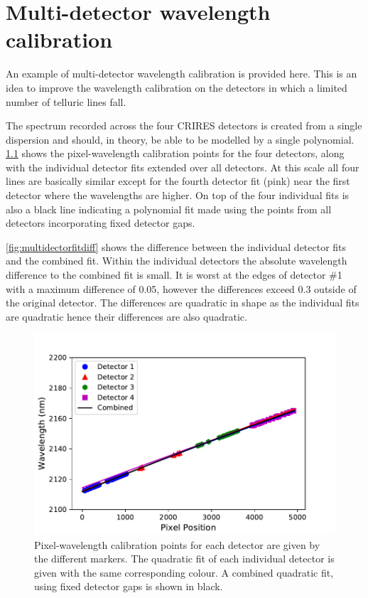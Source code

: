 
\chapter{Multi-detector wavelength calibration} %
\label{appendix:wavelength_fitting}

An example of multi-detector wavelength calibration is provided here.
This is an idea to improve the wavelength calibration on the detectors in which a limited number of telluric lines fall.

The spectrum recorded across the four {CRIRES} detectors is created from a single dispersion and should, in theory, be able to be modelled by a single polynomial.
\cref{fig:multidectorfit} shows the pixel-wavelength calibration points for the four detectors, along with the individual detector fits extended over all detectors.
At this scale all four lines are basically similar except for the fourth detector fit (pink) near the first detector where the wavelengths are higher.
On top of the four individual fits is also a black line indicating a polynomial fit made using the points from all detectors incorporating fixed detector gaps.

\cref{fig:multidectorfitdiff} shows the difference between the individual detector fits and the combined fit.
Within the individual detectors the absolute wavelength difference to the combined fit is small.
It is worst at the edges of detector \#1 with a maximum difference of 0.05\nm{}, however the differences exceed 0.3\nm{} outside of the original detector.
The differences are quadratic in shape as the individual fits are quadratic hence their differences are also quadratic.

\begin{figure}
    \centering
    \includegraphics[width=0.7\linewidth]{./figures/appendix/combined_wav_fit}
    \caption[Multi-detector fit and difference to individual fits.]{Pixel-wavelength calibration points for each detector are given by the different markers.
    The quadratic fit of each individual detector is given with the same corresponding colour.
    A combined quadratic fit, using fixed detector gaps is shown in black.}
    \label{fig:multidectorfit}
\end{figure}

